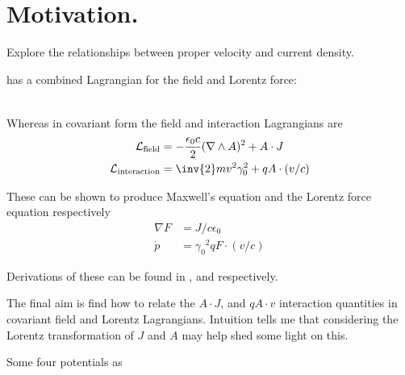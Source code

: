 \documentclass{article}
\author{Peeter Joot}
\date{ October 17, 2008.  Last Revision: $Date: 2008/10/18 00:48:28 $ }
\newcommand{\LL}[0]{\mathcal{L}}
\newcommand{\grad}[0]{\nabla}
\newcommand{\pdot}[0]{\dot{p}}
\begin{document}

\tableofcontents

\section{ Motivation.}

Explore the relationships between proper velocity and current density.

\cite{goldstein1951cm} has a combined Lagrangian for the field and Lorentz force:

\begin{align*}
\end{align*}

Whereas in covariant form the field and interaction Lagrangians are
\begin{align}\label{eqn:maxlag}
\LL_{\text{field}} &= -\frac{\epsilon_0 c}{2} (\grad \wedge A)^2 + A \cdot J \\
\LL_{\text{interaction}} &= \inv{2} m v^2 \gamma_0^2 + q A \cdot (v/c)
\end{align}

These can be shown to produce Maxwell's equation and the Lorentz force equation respectively
\begin{align}
\grad F &= J/c\epsilon_0 \\
\pdot &= {\gamma_0}^2 q F \cdot (v/c)
\end{align}

Derivations of these can be found in \cite{PJFieldLagrangian}, and \cite{PJSrLorentzForce} respectively.

The final aim is 
find how to relate the $A\cdot J$, and $q A \cdot v$ interaction quantities in covariant field and
Lorentz Lagrangians.  Intuition tells me that considering the Lorentz transformation of $J$ and $A$ may help
shed some light on this.

Some four potentials as 

\section{ }



\end{document}
